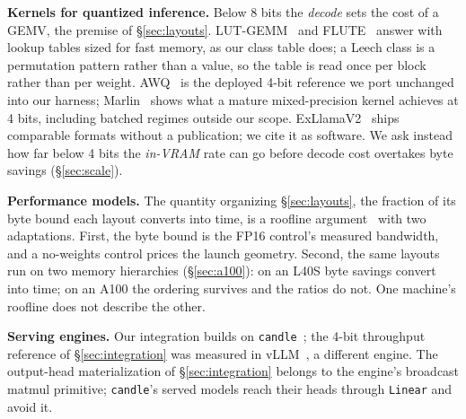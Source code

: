 \textbf{Kernels for quantized inference.} Below 8 bits the \emph{decode} sets
the cost of a GEMV, the premise of \S\ref{sec:layouts}.
LUT-GEMM~\citep{lutgemm2024} and FLUTE~\citep{flute2024} answer with lookup
tables sized for fast memory, as our class table does; a Leech class is a
permutation pattern rather than a value, so the table is read once per block
rather than per weight. AWQ~\citep{awq2024} is the deployed 4-bit reference
we port unchanged into our harness; Marlin~\citep{marlin2024} shows what a
mature mixed-precision kernel achieves at 4 bits, including batched regimes
outside our scope. ExLlamaV2~\citep{exllamav2} ships comparable formats
without a publication; we cite it as software. We ask instead how far below
4 bits the \emph{in-VRAM} rate can go before decode cost overtakes byte
savings (\S\ref{sec:scale}).

\textbf{Performance models.} The quantity organizing \S\ref{sec:layouts}, the
fraction of its byte bound each layout converts into time, is a roofline
argument~\citep{roofline2009} with two adaptations. First, the byte bound is
the FP16 control's measured bandwidth, and a no-weights control prices the
launch geometry. Second, the same layouts run on two memory hierarchies
(\S\ref{sec:a100}): on an L40S byte savings convert into time; on an A100
the ordering survives and the ratios do not. One machine's roofline does not
describe the other.

\textbf{Serving engines.} Our integration builds on
\texttt{candle}~\citep{candle2023}; the 4-bit throughput reference of
\S\ref{sec:integration} was measured in vLLM~\citep{vllm2023}, a different
engine. The output-head materialization of \S\ref{sec:integration} belongs to
the engine's broadcast matmul primitive; \texttt{candle}'s served models
reach their heads through \texttt{Linear} and avoid it.
